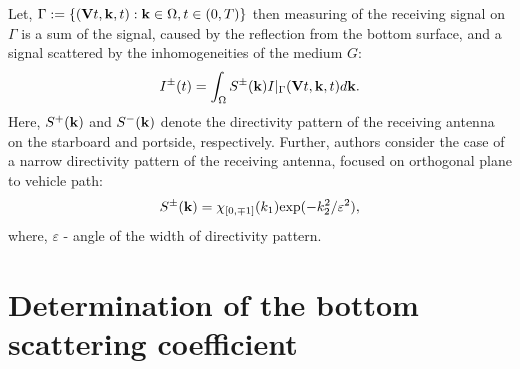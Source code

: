 \documentclass{procDDs}
\begin{document}
Let, $\Gamma := \{ (\mathbf{V}t, \mathbf{k}, t): \mathbf{k} \in \Omega, t \in (0,T) \}$  then measuring of the receiving signal on $\Gamma$ is a sum of the signal, caused by the reflection from the bottom surface, and a signal scattered by the inhomogeneities of the medium $G$:
\begin{multline}
	\label{sum_sig}
	I^\pm(t) = \int_{\Omega} S^\pm(\mathbf{k}) I|_{\Gamma}(\mathbf{V}t, \mathbf{k}, t)d\mathbf{k}.
\end{multline}
Here, $S^+(\mathbf{k})$ and $S^-(\mathbf{k})$ denote the directivity pattern of the receiving antenna on the starboard and portside, respectively. Further, authors consider the case of a narrow directivity pattern of the receiving antenna, focused on orthogonal plane to vehicle path:
\begin{equation}
\label{diagram}
S^\pm(\mathbf{k}) = \chi_{[0,\mp1]}(k_1)  \text{exp}(-k_2^2/\varepsilon^2),
\end{equation}
where, $\varepsilon $ - angle of the width of directivity pattern.

\section{Determination of the bottom scattering coefficient}
\end{document}
